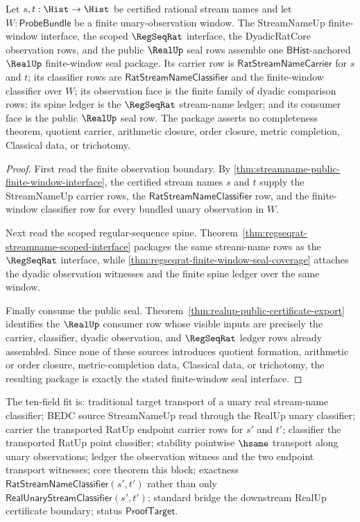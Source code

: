 \begin{theorem}
\label{thm:regseqrat-finite-window-real-seal-interface}
Let $s,t:\Hist\to\Hist$ be certified rational stream names and let
$W:\mathsf{ProbeBundle}$ be a finite unary-observation window. The
StreamNameUp finite-window interface, the scoped $\RegSeqRat$ interface, the
DyadicRatCore observation rows, and the public $\RealUp$ seal rows assemble one
$\mathsf{BHist}$-anchored $\RealUp$ finite-window seal package. Its carrier row
is $\mathsf{RatStreamNameCarrier}$ for $s$ and $t$; its classifier rows are
$\mathsf{RatStreamNameClassifier}$ and the finite-window classifier over $W$;
its observation face is the finite family of dyadic comparison rows; its spine
ledger is the $\RegSeqRat$ stream-name ledger; and its consumer face is the
public $\RealUp$ seal row. The package asserts no completeness theorem, quotient
carrier, arithmetic closure, order closure, metric completion, Classical data,
or trichotomy.
\end{theorem}
\begin{proof}
First read the finite observation boundary. By
\autoref{thm:streamname-public-finite-window-interface}, the certified stream
names $s$ and $t$ supply the StreamNameUp carrier rows, the
$\mathsf{RatStreamNameClassifier}$ row, and the finite-window classifier row
for every bundled unary observation in $W$.

Next read the scoped regular-sequence spine. Theorem~\ref{thm:regseqrat-streamname-scoped-interface}
packages the same stream-name rows as the $\RegSeqRat$ interface, while
\autoref{thm:regseqrat-finite-window-seal-coverage} attaches the dyadic
observation witnesses and the finite spine ledger over the same window.

Finally consume the public seal. Theorem~\ref{thm:realup-public-certificate-export}
identifies the $\RealUp$ consumer row whose visible inputs are precisely the
carrier, classifier, dyadic observation, and $\RegSeqRat$ ledger rows already
assembled. Since none of these sources introduces quotient formation,
arithmetic or order closure, metric-completion data, Classical data, or
trichotomy, the resulting package is exactly the stated finite-window seal
interface.
\end{proof}

The ten-field fit is: traditional target transport of a unary real stream-name
classifier; BEDC source StreamNameUp read through the RealUp unary classifier;
carrier the transported RatUp endpoint carrier rows for $s'$ and $t'$;
classifier the transported RatUp point classifier; stability pointwise
$\hsame$ transport along unary observations; ledger the observation witness
and the two endpoint transport witnesses; core theorem this block; exactness
$\mathsf{RatStreamNameClassifier}(s',t')$ rather than only
$\mathsf{RealUnaryStreamClassifier}(s',t')$; standard bridge the downstream
RealUp certificate boundary; status $\mathsf{ProofTarget}$.

